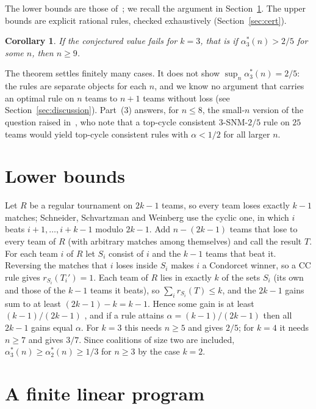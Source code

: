 \documentclass[11pt]{amsart}
\newtheorem{corollary}[theorem]{Corollary}
\theoremstyle{definition}
\theoremstyle{remark}
\begin{document}
The lower bounds are those of~\cite{SSW17}; we recall the argument in Section~\ref{sec:lower}. The upper bounds are explicit rational rules, checked exhaustively (Section~\ref{sec:cert}).

\begin{corollary}
If the conjectured value fails for $k=3$, that is if $\alpha^*_3(n)>2/5$ for some $n$, then $n\ge 9$.
\end{corollary}

The theorem settles finitely many cases. It does not show $\sup_n\alpha^*_3(n)=2/5$: the rules are separate objects for each $n$, and we know no argument that carries an optimal rule on $n$ teams to $n+1$ teams without loss (see Section~\ref{sec:discussion}). Part~(3) answers, for $n\le 8$, the small-$n$ version of the question raised in~\cite[Section~5]{MSS24}, who note that a top-cycle consistent $3$-SNM-$2/5$ rule on $25$ teams would yield top-cycle consistent rules with $\alpha<1/2$ for all larger $n$.

\section{Lower bounds}\label{sec:lower}

Let $R$ be a regular tournament on $2k-1$ teams, so every team loses exactly $k-1$ matches; Schneider, Schvartzman and Weinberg use the cyclic one, in which $i$ beats $i+1,\dots,i+k-1$ modulo $2k-1$. Add $n-(2k-1)$ teams that lose to every team of $R$ (with arbitrary matches among themselves) and call the result $T$. For each team $i$ of $R$ let $S_i$ consist of $i$ and the $k-1$ teams that beat it. Reversing the matches that $i$ loses inside $S_i$ makes $i$ a Condorcet winner, so a CC rule gives $r_{S_i}(T_i')=1$. Each team of $R$ lies in exactly $k$ of the sets $S_i$ (its own and those of the $k-1$ teams it beats), so $\sum_i r_{S_i}(T)\le k$, and the $2k-1$ gains sum to at least $(2k-1)-k=k-1$. Hence some gain is at least $(k-1)/(2k-1)$ \cite[Theorem~3.2]{SSW17}, and if a rule attains $\alpha=(k-1)/(2k-1)$ then all $2k-1$ gains equal $\alpha$. For $k=3$ this needs $n\ge 5$ and gives $2/5$; for $k=4$ it needs $n\ge 7$ and gives $3/7$. Since coalitions of size two are included, $\alpha^*_3(n)\ge\alpha^*_2(n)\ge1/3$ for $n\ge3$ by the case $k=2$.

\section{A finite linear program}
\end{document}
